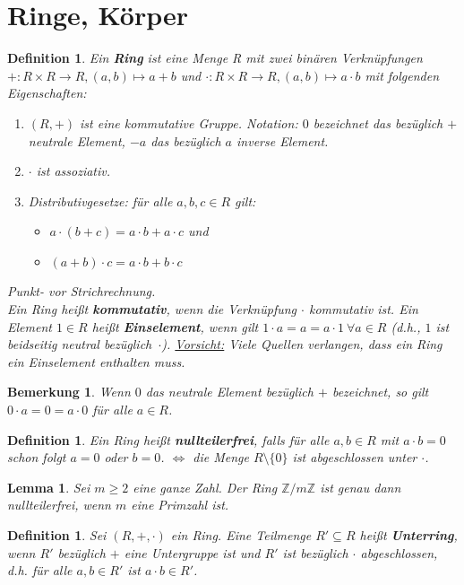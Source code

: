 \documentclass[12pt,a4paper]{article}
\theoremstyle{plain}
\newtheorem{Lemma}[Theorem]{Lemma}
\newtheorem{Definition}[Theorem]{Definition}
\newtheorem{Bemerkung}[Theorem]{Bemerkung}
\newcommand{\herv}[1]{{\emph{\textbf{#1}}}}
\newcommand{\Z}{\mathbb{Z}}
\numberwithin{equation}{section}
\begin{document}
\section{Ringe, Körper}
\begin{Definition}
Ein \herv{Ring} ist eine Menge R mit zwei binären Verknüpfungen $+:R\times R\rightarrow R, (a,b)\mapsto a+b$ und $\cdot :R\times R\rightarrow R, (a,b)\mapsto a\cdot b$ mit folgenden Eigenschaften:
\begin{enumerate}
\renewcommand{\labelenumi}{\emph{\underline{R\arabic{enumi}}}}
\item $(R,+)$ ist eine kommutative Gruppe. Notation: $0$ bezeichnet das bezüglich $+$ neutrale Element, $-a$ das bezüglich $a$ inverse Element.
\item $\cdot$ ist assoziativ.
\item Distributivgesetze: für alle $a,b,c\in R$ gilt:
\begin{itemize}
\item $a\cdot(b+c)=a\cdot b+ a\cdot c$ und
\item $(a+b)\cdot c= a\cdot b + b\cdot c$
\end{itemize}
\end{enumerate}
\glqq Punkt- vor Strichrechnung\grqq. \\
Ein Ring heißt \herv{kommutativ}, wenn die Verknüpfung $\cdot$ kommutativ ist. Ein Element $1\in R$ heißt \herv{Einselement}, wenn gilt $1\cdot a=a=a\cdot 1\ \forall a\in R$ (d.h., $1$ ist beidseitig neutral \mbox{bezüglich $\cdot$).} \underline{Vorsicht:} Viele Quellen verlangen, dass ein Ring ein Einselement enthalten muss. 
\end{Definition}
\begin{Bemerkung}
Wenn $0$ das neutrale Element bezüglich $+$ bezeichnet, so gilt $0\cdot a=0=a\cdot 0$ für alle $a\in R$.
\end{Bemerkung}
\begin{Definition}
Ein Ring heißt \herv{nullteilerfrei}, falls für alle $a,b\in R$ mit $a\cdot b=0$ schon folgt $a=0$ oder $b=0$. $\Leftrightarrow$ die Menge $R\setminus\{0\}$ ist abgeschlossen unter $\cdot$.
\end{Definition}
\begin{Lemma}
Sei $m\geq 2$ eine ganze Zahl. Der Ring $\Z/m\Z$ ist genau dann nullteilerfrei, wenn $m$ eine Primzahl ist.
\end{Lemma}
\begin{Definition}
Sei $(R,+,\cdot)$ ein Ring. Eine Teilmenge $R'\subseteq R$ heißt \herv{Unterring}, wenn $R'$ bezüglich $+$ eine Untergruppe ist und $R'$ ist bezüglich $\cdot$ abgeschlossen, d.h. für alle $a,b\in R'$ ist $a\cdot b\in R'$.
\end{Definition}
\end{document}
